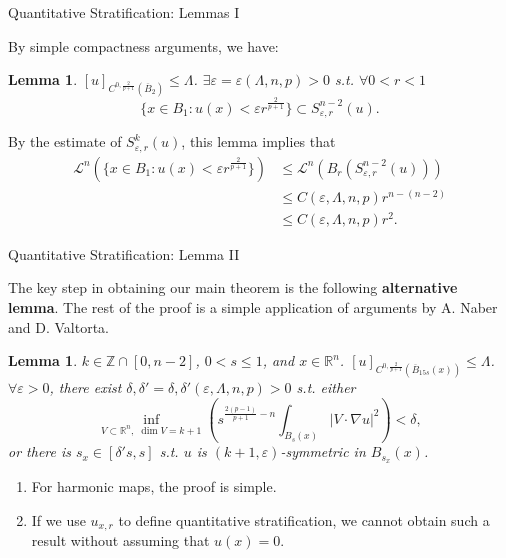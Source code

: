 \documentclass[11pt]{beamer}
\newcommand{\va}{\varepsilon}
\newcommand{\Lda}{\Lambda}
\newcommand{\cL}{\mathcal{L}}
\newcommand{\Z}{\mathbb{Z}}
\newcommand{\R}{\mathbb{R}}
\newcommand{\f}{\frac}
\newcommand{\ol}{\overline}
\newcommand{\na}{\nabla}
\def\({\left(}                 \def\){\right)}
\theoremstyle{plain}
\newtheorem{lem}[thm]{Lemma}
\theoremstyle{definition}
\begin{document}
\begin{frame}{Quantitative Stratification: Lemmas I}

By simple compactness arguments, we have:

\begin{lem}
$ [u]_{C^{0,\f{2}{p+1}}(\ol{B}_{2})}\leq\Lda $. $ \exists\va=\va(\Lda,n,p)>0 $ s.t. $ \forall 0<r<1 $
$$
\{x\in B_1:u(x)<\va r^{\f{2}{p+1}}\}\subset S_{\va,r}^{n-2}(u).
$$
\end{lem}\pause

By the estimate of $ S_{\va,r}^k(u) $, this lemma implies that
\begin{align*}
\cL^n(\{x\in B_1:u(x)<\va r^{\f{2}{p+1}}\})&\leq \cL^n(B_r(S_{\va,r}^{n-2}(u)))\\
&\leq C(\va,\Lda,n,p)r^{n-(n-2)}\\
&\leq C(\va,\Lda,n,p)r^2.
\end{align*}

\end{frame}

\begin{frame}{Quantitative Stratification: Lemma II}

The key step in obtaining our main theorem is the following \textbf{alternative lemma}. The rest of the proof is a simple application of arguments by A. Naber and D. Valtorta.

\begin{lem}\label{kplus1MEMStwoone}
$ k\in\Z\cap[0,n-2] $, $ 0<s\leq 1 $, and $ x\in\R^n $. $ [u]_{C^{0,\f{2}{p+1}}(\ol{B}_{15s}(x))}\leq\Lda $. $ \forall\va>0 $, there exist $ \delta,\delta'=\delta,\delta'(\va,\Lda,n,p)>0 $ s.t. either
$$
\inf_{V\subset\R^n,\,\,\dim V=k+1}\(s^{\f{2(p-1)}{p+1}-n}\int_{B_s(x)}|V\cdot\na u|^2\)<\delta,
$$
or there is $ s_x\in[\delta's,s] $ s.t. $ u $ is $ (k+1,\va) $-symmetric in $ B_{s_x}(x) $.
\end{lem}\pause

\begin{enumerate}
\item For harmonic maps, the proof is simple.
\item If we use $ u_{x,r} $ to define quantitative stratification, we cannot obtain such a result without assuming that $ u(x)=0 $.
\end{enumerate}

\end{frame}
\end{document}
